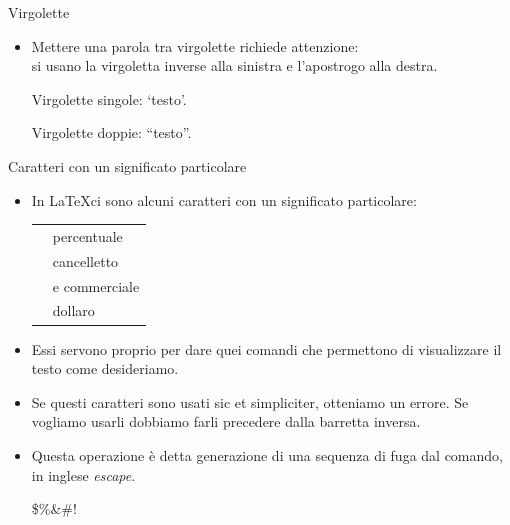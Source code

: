 \documentclass{beamer}
\begin{document}

\begin{frame}[fragile]{\centerline{Virgolette}}
\small
\begin{itemize}
\item Mettere una parola tra virgolette richiede attenzione:\\
si usano la virgoletta inverse \keystroke{\`{}} alla sinistra e l'apostrogo \keystroke{\'{}} alla destra.

\begin{exampletwouptiny}
Virgolette singole: `testo'.

Virgolette doppie: ``testo''.
\end{exampletwouptiny}

\end{itemize}
\end{frame}


\begin{frame}[fragile]{\centerline{Caratteri con un significato particolare}}
\small
\begin{itemize}

\item In \LaTeX ci sono  alcuni caratteri con un significato particolare:\\[1ex]
\begin{tabular}{cl}
\keystrokebftt{\%} & percentuale              \\
\keystrokebftt{\#} & cancelletto \\
\keystrokebftt{\&} & e commerciale                 \\
\keystrokebftt{\$} & dollaro               \\
\end{tabular}
\item Essi servono proprio per dare quei comandi che permettono di visualizzare il testo come desideriamo.
\item Se questi caratteri sono usati sic et simpliciter, otteniamo un errore. Se vogliamo usarli dobbiamo farli precedere dalla barretta inversa.
\item Questa operazione \`{e} detta generazione di una sequenza di fuga dal comando, in inglese \emph{escape}.
\begin{exampletwoup}
\$\%\&\#!
\end{exampletwoup}
\end{itemize}
\end{frame}
\end{document}
